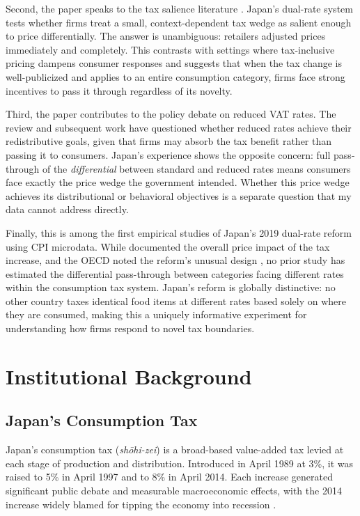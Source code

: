 \documentclass[12pt]{article}
\begin{document}
Second, the paper speaks to the tax salience literature \citep{chetty2009salience, finkelstein2009ztax, taubinsky2018attention}. Japan's dual-rate system tests whether firms treat a small, context-dependent tax wedge as salient enough to price differentially. The answer is unambiguous: retailers adjusted prices immediately and completely. This contrasts with settings where tax-inclusive pricing dampens consumer responses \citep{chetty2009salience} and suggests that when the tax change is well-publicized and applies to an entire consumption category, firms face strong incentives to pass it through regardless of its novelty.

Third, the paper contributes to the policy debate on reduced VAT rates. The \citet{mirrlees2011tax} review and subsequent work \citep{keen2004optimal, crossley2009vat} have questioned whether reduced rates achieve their redistributive goals, given that firms may absorb the tax benefit rather than passing it to consumers. Japan's experience shows the opposite concern: full pass-through of the \textit{differential} between standard and reduced rates means consumers face exactly the price wedge the government intended. Whether this price wedge achieves its distributional or behavioral objectives is a separate question that my data cannot address directly.

Finally, this is among the first empirical studies of Japan's 2019 dual-rate reform using CPI microdata. While \citet{asano2019tax} documented the overall price impact of the tax increase, and the OECD noted the reform's unusual design \citep{oecd2020japan}, no prior study has estimated the differential pass-through between categories facing different rates within the consumption tax system. Japan's reform is globally distinctive: no other country taxes identical food items at different rates based solely on where they are consumed, making this a uniquely informative experiment for understanding how firms respond to novel tax boundaries.


\section{Institutional Background}
\label{sec:background}

\subsection{Japan's Consumption Tax}

Japan's consumption tax (\textit{sh\={o}hi-zei}) is a broad-based value-added tax levied at each stage of production and distribution. Introduced in April 1989 at 3\%, it was raised to 5\% in April 1997 and to 8\% in April 2014. Each increase generated significant public debate and measurable macroeconomic effects, with the 2014 increase widely blamed for tipping the economy into recession \citep{oecd2020japan}.
\end{document}
